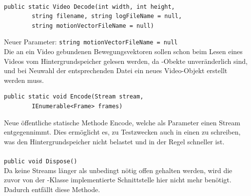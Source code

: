 \paragraph{}
\begin{itemize}
	\add \begin{verbatim}public static Video Decode(int width, int height,
	    string filename, string logFileName = null,
	    string motionVectorFileName = null)
		\end{verbatim}
	Neuer Parameter: \verb!string motionVectorFileName = null!\\
	Die an ein Video gebundenen Bewegungsvektoren sollen schon beim Lesen eines Videos vom Hintergrundspeicher gelesen werden, da -Obekte unveränderlich sind, und bei Neuwahl der entsprechenden Datei ein neues Video-Objekt erstellt werden muss.
	\add \begin{verbatim}public static void Encode(Stream stream, 
	    IEnumerable<Frame> frames)
	\end{verbatim}
	Neue öffentliche statische Methode Encode, welche als Parameter einen Stream entgegennimmt. Dies ermöglicht es, zu Testzwecken auch in einen  zu schreiben, was den Hintergrundspeicher nicht belastet und in der Regel schneller ist.
\end{itemize}

\paragraph{}
\begin{itemize}
	\remove \verb!public void Dispose()! \\
	Da keine Streams länger als unbedingt nötig offen gehalten werden, wird die zuvor von der -Klasse implementierte Schnittstelle  hier nicht mehr benötigt. Dadurch entfällt diese Methode.
\end{itemize}
\newpage

\subsection{}

